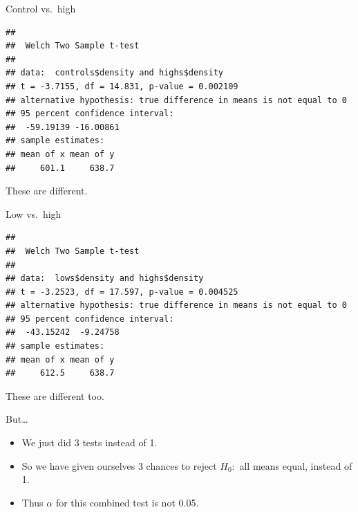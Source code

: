 \documentclass[ignorenonframetext,]{beamer}
\newenvironment{Shaded}{\begin{snugshade}}{\end{snugshade}}
\newcommand{\KeywordTok}[1]{\textcolor[rgb]{0.13,0.29,0.53}{\textbf{#1}}}
\newcommand{\NormalTok}[1]{#1}
\newcommand{\OperatorTok}[1]{\textcolor[rgb]{0.81,0.36,0.00}{\textbf{#1}}}
\providecommand{\tightlist}{%
  \setlength{\itemsep}{0pt}\setlength{\parskip}{0pt}}
\begin{document}
\begin{frame}[fragile]{Control vs.~high}
\protect\hypertarget{control-vs.high}{}

\begin{Shaded}
\end{Shaded}

\begin{verbatim}
## 
##  Welch Two Sample t-test
## 
## data:  controls$density and highs$density
## t = -3.7155, df = 14.831, p-value = 0.002109
## alternative hypothesis: true difference in means is not equal to 0
## 95 percent confidence interval:
##  -59.19139 -16.00861
## sample estimates:
## mean of x mean of y 
##     601.1     638.7
\end{verbatim}

These are different.

\end{frame}

\begin{frame}[fragile]{Low vs.~high}
\protect\hypertarget{low-vs.high}{}

\begin{Shaded}
\end{Shaded}

\begin{verbatim}
## 
##  Welch Two Sample t-test
## 
## data:  lows$density and highs$density
## t = -3.2523, df = 17.597, p-value = 0.004525
## alternative hypothesis: true difference in means is not equal to 0
## 95 percent confidence interval:
##  -43.15242  -9.24758
## sample estimates:
## mean of x mean of y 
##     612.5     638.7
\end{verbatim}

These are different too.

\end{frame}

\begin{frame}{But\ldots{}}
\protect\hypertarget{but}{}

\begin{itemize}
\tightlist
\item
  We just did 3 tests instead of 1.
\item
  So we have given ourselves 3 chances to reject \(H_0:\) all means
  equal, instead of 1.
\item
  Thus \(\alpha\) for this combined test is not 0.05.
\end{itemize}

\end{frame}
\end{document}
